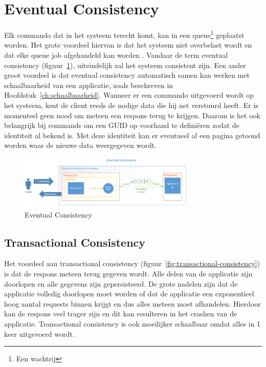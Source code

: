 
\section{Eventual Consistency}
\label{sec:eventual-consistency}

Elk commando dat in het systeem terecht komt, kan in een queue\footnote{Een wachtrij} geplaatst worden. Het grote voordeel hiervan is dat het systeem niet overbelast wordt en dat elke queue job afgehandeld kan worden \autocite{King2015EventualConsistency}. Vandaar de term eventual consistency (figuur~\ref{fig:eventual-consistency}), uiteindelijk zal het systeem consistent zijn. Een ander groot voordeel is dat eventual consistency automatisch samen kan werken met schaalbaarheid van een applicatie, zoals beschreven in Hoofdstuk~\ref{ch:schaalbaarheid}. Wanneer er een commando uitgevoerd wordt op het systeem, kent de client reeds de nodige data die hij net verstuurd heeft. Er is momenteel geen nood om meteen een respons terug te krijgen.
Daarom is het ook belangrijk bij commands om een \gls{GUID} op voorhand te definiëren zodat de identiteit al bekend is. Met deze identiteit kan er eventueel al een pagina getoond worden waar de nieuwe data weergegeven wordt.

\begin{figure}[h]
  \caption{Eventual Consistency} \label{fig:eventual-consistency}
  \centering
  \includegraphics[width=0.75\textwidth]{img/eventual-consistency}
\end{figure}

\subsection{Transactional Consistency}
\label{subsec:transactional-consistency}

Het voordeel aan transactional consistency (figuur~\ref{fig:transactional-consistency}) is dat de respons meteen terug gegeven wordt. Alle delen van de applicatie zijn doorlopen en alle gegevens zijn gepersisteerd. De grote nadelen zijn dat de applicatie volledig doorlopen moet worden of dat de applicatie een exponentieel hoog aantal \glspl{request} binnen krijgt en dus alles meteen moet afhandelen. Hierdoor kan de respons veel trager zijn en dit kan resulteren in het crashen van de applicatie.
Transactional consistency is ook moeilijker schaalbaar omdat alles in 1 keer uitgevoerd wordt.

